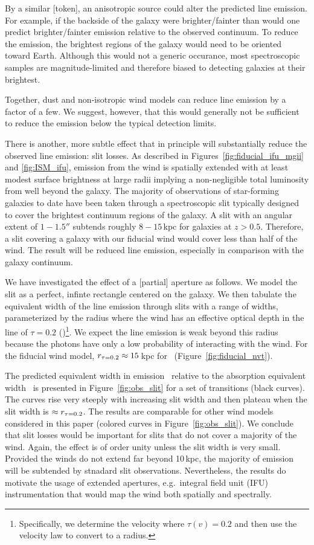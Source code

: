 \documentclass[12pt,preprint]{aastex}
\begin{document}
By a similar [token], an anisotropic source could alter the predicted
line emission.  For example, if the backside of the galaxy were
brighter/fainter than would one predict brighter/fainter emission
relative to the observed continuum.
To reduce the emission, the brightest regions
of the galaxy would need to be oriented toward Earth.  Although this would not a
generic occurance, most spectroscopic samples are magnitude-limited
and therefore biased to detecting galaxies at their brightest.

Together, dust and non-isotropic wind models can reduce line emission
by a factor of a few.  We suggest, however, that this would generally
not be sufficient to reduce the emission below the typical detection
limits. 

There is another, more subtle effect that in principle will
substantially reduce the observed line emission: slit losses.  As
described in Figures~\ref{fig:fiducial_ifu_mgii} and
\ref{fig:ISM_ifu}, emission from the wind is spatially extended with
at least modest surface brightness at large radii implying a
non-negligible total luminosity from well beyond the galaxy.  
The majority of observations of star-forming galaxies to date have
been taken through a spectroscopic slit typically designed to cover
the brightest continuum regions of the galaxy.  A slit with an angular
extent of $1-1.5''$ subtends roughly $8-15$\,kpc for galaxies at $z>0.5$.
Therefore, a slit covering a galaxy with our fiducial wind would cover
less than half of the wind.  The result will be reduced line emission,
especially in comparison with the galaxy continuum.

We have investigated the effect of a [partial] aperture as follows.
We model the slit as a perfect, infinte rectangle centered on the
galaxy.  We then tabulate the equivalent width of the line emission
through slits with a range of widths, parameterized by the radius
where the wind has an effective optical depth in the line of $\tau =
0.2$ (\rtt)\footnote{Specifically, we determine the
  velocity where $\tau(v) = 0.2$ and then use the velocity law to
  convert to a radius.}.   We expect the line emission is weak beyond
this radius because the photons have only a low probability of
interacting with the wind.  For the fiducial wind model, $r_{\tau = 0.2}
\approx 15$\,kpc for \mgiia\ (Figure~\ref{fig:fiducial_nvt}).  

The predicted equivalent width in emission \ewe\ relative to the absorption
equivalent width \ewabs\ is presented in
Figure~\ref{fig:obs_slit} for a set of transitions (black curves).
The curves rise very steeply with increasing slit width and then
plateau when the slit width is $\approx r_{\tau = 0.2}$.  
The results are comparable for other wind models considered
in this paper (colored curves in Figure~\ref{fig:obs_slit}).
We conclude that slit losses would be important for slits that do not
cover a majority of the wind.   Again, the effect is of order unity
unless the slit width is very small.   Provided the winds do not
extend far beyond 10\,kpc, the majority of emission will be subtended
by stnadard slit observations.  Nevertheless, the results do motivate
the usage of extended apertures, e.g.\ integral field unit (IFU)
instrumentation that would map the wind both spatially and spectrally.
\end{document}
